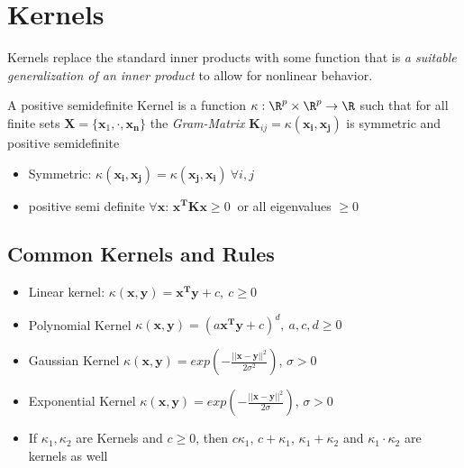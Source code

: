 \documentclass[english]{latex4ei/latex4ei_sheet}
\begin{document}
\section{Kernels}
\begin{sectionbox}
Kernels replace the standard inner products with some function that is \emph{a suitable generalization of an inner product} to allow for nonlinear behavior.
\begin{emphbox}
    A positive semidefinite Kernel is a function $\kappa: \R^{p}\times \R^{p}\rightarrow\R$ such that for all finite sets $\mathbf{X}=\{\mathbf{x}_1,\cdot,\mathbf{x_n}\}$ the \emph{Gram-Matrix} $\mathbf{K}_{ij} = \kappa(\mathbf{x_i,x_j})$ is symmetric and positive semidefinite  
\end{emphbox}
\begin{itemize}
    \item Symmetric: $\kappa(\mathbf{x_i,x_j})=\kappa(\mathbf{x_j,x_i}) \ \forall i,j$
    \item positive semi definite $\forall \mathbf{x}$: $\mathbf{x^TKx}\ge 0\ $ or all eigenvalues $\ge 0$
\end{itemize}
\subsection{Common Kernels and Rules}
\begin{itemize}
    \item Linear kernel: $\kappa(\mathbf{x,y})=\mathbf{x^Ty}+c, \ c\ge0$
    \item Polynomial Kernel $\kappa(\mathbf{x,y})=(a\mathbf{x^Ty}+c)^d,\ a,c,d\ge0 $
    \item Gaussian Kernel $\kappa(\mathbf{x,y})=exp(-\frac{||\mathbf{x-y}||^2}{2\sigma^2})$, $\sigma>0$
    \item Exponential Kernel $\kappa(\mathbf{x,y})=exp(-\frac{||\mathbf{x-y}||^2}{2\sigma})$, $\sigma>0$
    \item If $\kappa_1, \kappa_2$ are Kernels and $c\ge0$, then $c\kappa_1$, $c+\kappa_1$, $\kappa_1+\kappa_2$ and $\kappa_1\cdot\kappa_2$ are kernels as well
\end{itemize}
\end{sectionbox}
\end{document}
